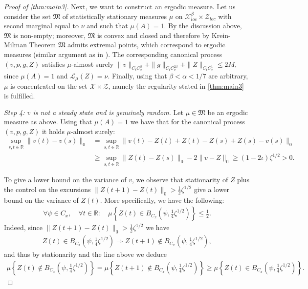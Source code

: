 \documentclass[10pt,a4paper]{amsart}
\numberwithin{equation}{section}
\numberwithin{corollario}{section}
\numberwithin{lemma}{section}
\numberwithin{prop}{section}
\theoremstyle{definition}
\theoremstyle{remark}
\newcommand{\R}{\mathbb{R}}
\begin{document}
\begin{proof}[Proof of \autoref{thm:main3}]
Next, we want to construct an ergodic measure. Let us consider the set $\mathfrak{M}$ of statistically stationary measures $\mu$ on $\mathscr{X}^\beta_{loc} \times \mathscr{Z}_{loc}$ with second marginal equal to $\nu$ and such that $\mu(A) = 1$. 
By the discussion above, $\mathfrak{M}$ is non-empty; moreover, $\mathfrak{M}$ is convex and closed and therefore by Krein-Milman Theorem $\mathfrak{M}$ admits extremal points, which correspond to ergodic measures (similar argument as in \cite[Theorem 4.2]{HoZhZh25}).
The corresponding canonical process $(v,p,g,Z)$ satisfies $\mu$-almost surely $ \|v\|_{C_tC^\beta_x} 
+ 
\|g\|_{C_tC^{2\beta}_x} 
+
\|Z\|_{C_tC^1_x} \leq 2M$,
since $\mu(A)=1$ and $\mathscr{L}_\mu(Z)=\nu$. 
Finally, using that $\beta<\alpha<1/7$ are arbitrary, $\mu$ is concentrated on the set $\mathscr{X} \times \mathscr{Z}$, namely the regularity stated in \autoref{thm:main3} is fulfilled.

\textit{Step 4: $v$ is not a steady state and is genuinely random.}
Let $\mu \in \mathfrak{M}$ be an ergodic measure as above.  
Using that $\mu(A)=1$ we have that for the canonical process $(v,p,g,Z)$ it holds $\mu$-almost surely:
\begin{align}
\sup_{s,t \in \R} \|v(t) - v(s)\|_0
&=
\sup_{s,t \in \R} \|v(t) - Z(t) + Z(t) - Z(s) + Z(s)- v(s)\|_0
\\
&\geq
\sup_{s,t \in \R} \|Z(t) - Z(s)\|_0 - 2 \|v-Z\|_0
\geq (1-2\iota) \zeta^{1/2}>0.
\end{align}

To give a lower bound on the variance of $v$, we observe that stationarity of $Z$ plus the control on the excursions $\|Z(t+1) - Z(t)\|_0 > \frac12 \zeta^{1/2}$ give a lower bound on the variance of $Z(t)$. More specifically, we have the following:
\begin{align} \label{eq:variance.Z}
    \forall \psi \in C_x, \quad \forall t \in \R:
    \quad
    \mu \left\{ Z(t) \in B_{C_x}\left(\psi,\frac14 \zeta^{1/2}\right)  \right\} \leq \frac12.
\end{align}
Indeed, since $\|Z(t+1) - Z(t)\|_0 > \frac12 \zeta^{1/2}$ we have
\begin{align}
    Z(t) \in B_{C_x}\left(\psi,\frac14 \zeta^{1/2}\right) \Longrightarrow
    Z(t+1) \notin B_{C_x}\left(\psi,\frac14 \zeta^{1/2}\right),
\end{align}
and thus by stationarity and the line above we deduce
\begin{align}
    \mu \left\{ Z(t) \notin B_{C_x}\left(\psi,\frac14 \zeta^{1/2}\right)  \right\}=\mu \left\{ Z(t+1) \notin B_{C_x}\left(\psi,\frac14 \zeta^{1/2}\right)  \right\} \geq \mu \left\{ Z(t) \in B_{C_x}\left(\psi,\frac14 \zeta^{1/2}\right)  \right\}.
\end{align}


\end{proof}
\end{document}
